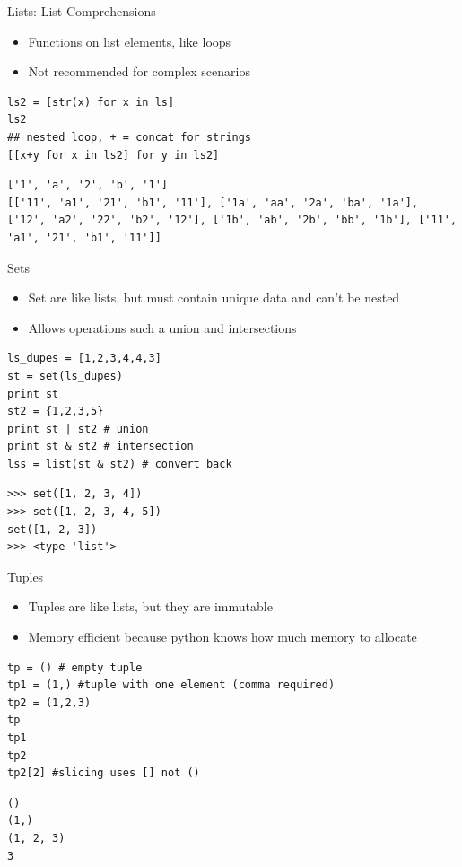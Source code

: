 \documentclass[presentation]{beamer}
\begin{document}
\begin{frame}[fragile,label=sec-4-1-9]{Lists: List Comprehensions}
 \begin{itemize}
\item Functions on list elements, like loops
\item Not recommended for complex scenarios
\end{itemize}

\lstset{numbers=left,language=Python,label= ,caption= }
\begin{lstlisting}
ls2 = [str(x) for x in ls]
ls2
## nested loop, + = concat for strings
[[x+y for x in ls2] for y in ls2]
\end{lstlisting}

\lstset{numbers=left,language=Python,label= ,caption= }
\begin{lstlisting}
['1', 'a', '2', 'b', '1']
[['11', 'a1', '21', 'b1', '11'], ['1a', 'aa', '2a', 'ba', '1a'], ['12', 'a2', '22', 'b2', '12'], ['1b', 'ab', '2b', 'bb', '1b'], ['11', 'a1', '21', 'b1', '11']]
\end{lstlisting}
\end{frame}


\begin{frame}[fragile,label=sec-4-1-10]{Sets}
 \begin{itemize}
\item Set are like lists, but must contain unique data and can't be nested
\item Allows operations such a union and intersections
\end{itemize}

\lstset{numbers=left,language=Python,label= ,caption= }
\begin{lstlisting}
ls_dupes = [1,2,3,4,4,3]
st = set(ls_dupes)
print st
st2 = {1,2,3,5}
print st | st2 # union
print st & st2 # intersection
lss = list(st & st2) # convert back
\end{lstlisting}

\lstset{numbers=left,language=Python,label= ,caption= }
\begin{lstlisting}
>>> set([1, 2, 3, 4])
>>> set([1, 2, 3, 4, 5])
set([1, 2, 3])
>>> <type 'list'>
\end{lstlisting}
\end{frame}


\begin{frame}[fragile,label=sec-4-1-11]{Tuples}
 \begin{itemize}
\item Tuples are like lists, but they are immutable
\item Memory efficient because python knows how much memory to allocate
\end{itemize}
\lstset{numbers=left,language=Python,label= ,caption= }
\begin{lstlisting}
tp = () # empty tuple
tp1 = (1,) #tuple with one element (comma required)
tp2 = (1,2,3)
tp
tp1
tp2
tp2[2] #slicing uses [] not ()
\end{lstlisting}

\lstset{numbers=left,language=Python,label= ,caption= }
\begin{lstlisting}
()
(1,)
(1, 2, 3)
3
\end{lstlisting}
\end{frame}
\end{document}
